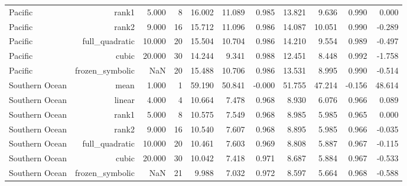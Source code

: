 \begin{table}
{\begin{tabular}{lrrrrrrrrrr}
Pacific & rank1 & 5.000 & 8 & 16.002 & 11.089 & 0.985 & 13.821 & 9.636 & 0.990 & 0.000 \\
Pacific & rank2 & 9.000 & 16 & 15.712 & 11.096 & 0.986 & 14.087 & 10.051 & 0.990 & -0.289 \\
Pacific & full\_quadratic & 10.000 & 20 & 15.504 & 10.704 & 0.986 & 14.210 & 9.554 & 0.989 & -0.497 \\
Pacific & cubic & 20.000 & 30 & 14.244 & 9.341 & 0.988 & 12.451 & 8.448 & 0.992 & -1.758 \\
Pacific & frozen\_symbolic & NaN & 20 & 15.488 & 10.706 & 0.986 & 13.531 & 8.995 & 0.990 & -0.514 \\
Southern Ocean & mean & 1.000 & 1 & 59.190 & 50.841 & -0.000 & 51.755 & 47.214 & -0.156 & 48.614 \\
Southern Ocean & linear & 4.000 & 4 & 10.664 & 7.478 & 0.968 & 8.930 & 6.076 & 0.966 & 0.089 \\
Southern Ocean & rank1 & 5.000 & 8 & 10.575 & 7.549 & 0.968 & 8.985 & 5.985 & 0.965 & 0.000 \\
Southern Ocean & rank2 & 9.000 & 16 & 10.540 & 7.607 & 0.968 & 8.895 & 5.985 & 0.966 & -0.035 \\
Southern Ocean & full\_quadratic & 10.000 & 20 & 10.461 & 7.603 & 0.969 & 8.808 & 5.887 & 0.967 & -0.115 \\
Southern Ocean & cubic & 20.000 & 30 & 10.042 & 7.418 & 0.971 & 8.687 & 5.884 & 0.967 & -0.533 \\
Southern Ocean & frozen\_symbolic & NaN & 21 & 9.988 & 7.032 & 0.972 & 8.597 & 5.664 & 0.968 & -0.588 \\
\bottomrule
\end{tabular}%
}
\end{table}
